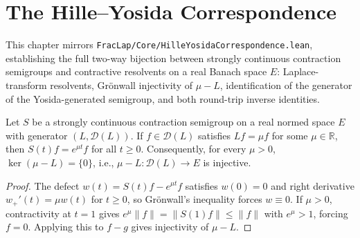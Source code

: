 \chapter{The Hille--Yosida Correspondence}

This chapter mirrors \texttt{FracLap/Core/HilleYosidaCorrespondence.lean}, establishing the full two-way bijection between strongly continuous contraction semigroups and contractive resolvents on a real Banach space $E$: Laplace-transform resolvents, Gr\"onwall injectivity of $\mu - L$, identification of the generator of the Yosida-generated semigroup, and both round-trip inverse identities.

\begin{theorem}\label{thm:generator_injectivity}
\leanok
Let $S$ be a strongly continuous contraction semigroup on a real normed space $E$ with generator $(L, \mathcal{D}(L))$. If $f \in \mathcal{D}(L)$ satisfies $L f = \mu f$ for some $\mu \in \mathbb{R}$, then $S(t)f = e^{\mu t} f$ for all $t \ge 0$. Consequently, for every $\mu > 0$, $\ker(\mu - L) = \{0\}$, i.e., $\mu - L : \mathcal{D}(L) \to E$ is injective.
\end{theorem}

\begin{proof}
\leanok
The defect $w(t) = S(t)f - e^{\mu t} f$ satisfies $w(0) = 0$ and right derivative $w_+'(t) = \mu w(t)$ for $t \ge 0$, so Gr\"onwall's inequality forces $w \equiv 0$. If $\mu > 0$, contractivity at $t = 1$ gives $e^\mu \lVert f \rVert = \lVert S(1)f \rVert \le \lVert f \rVert$ with $e^\mu > 1$, forcing $f = 0$. Applying this to $f - g$ gives injectivity of $\mu - L$.
\end{proof}

